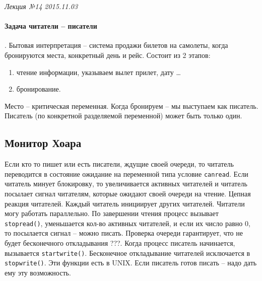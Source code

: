 \clearpage
\begin{flushright}
	\textit{Лекция №14}
	\textit{2015.11.03}
\end{flushright}

\paragraph{Задача читатели – писатели}. Бытовая интерпретация – система продажи билетов на самолеты, когда бронируются места, конкретный день и рейс. Состоит из 2 этапов:
\begin{enumerate}
    \item чтение информации, указываем вылет прилет, дату …
    \item бронирование.
\end{enumerate} 

Место – критическая переменная. Когда бронируем –  мы выступаем как писатель.   
Писатель (по конкретной разделяемой переменной) может быть только один.

\subsection{Монитор Хоара}
Если кто то пишет или есть писатели, ждущие своей очереди, то читатель переводится в состояние ожидание на переменной типа условие \verb|canread|.  Если читатель минует блокировку, то увеличивается активных читателей и читатель посылает сигнал читателям, которые ожидают своей очереди на чтение. Цепная реакция читателей. Каждый читатель инициирует других читателей. Читатели могу работать параллельно. По завершении чтения процесс вызывает \verb|stopread()|, уменьшается кол-во активных читателей, и если их число равно 0, то посылается сигнал – можно писать. Проверка очереди гарантирует, что не будет бесконечного откладывания ???. 
Когда процесс писатель начинается, вызывается \verb|startwrite()|.
Бесконечное откладывание читателей исключается в \verb|stopwrite()|. 
Эти функции есть в UNIX. 
Если писатель готов писать – надо дать ему эту возможность.

